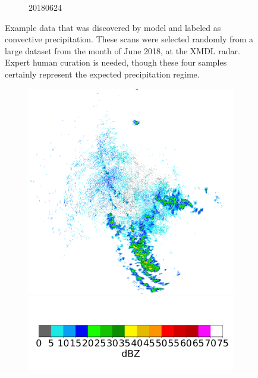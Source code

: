 \begin{figure}[h]
\begin{subfigure}[b]{0.45\textwidth}
		\caption{20180624}
		\label{fig:classifying_datadiscovery_ex4}
	\end{subfigure}
	\caption{Example data that was discovered by model and labeled as convective precipitation. These scans were selected randomly from a large dataset from the month of June 2018, at the XMDL radar. Expert human curation is needed, though these four samples certainly represent the expected precipitation regime.}
	\label{fig:classifying_datadiscovery}
\end{figure}

\begin{figure}[h]
	\centering
	\begin{subfigure}[b]{0.45\textwidth}
		\includegraphics[width=\textwidth]{./thesis_code/plots/midlothian-tx-20180903-063419-ref.png}
		\includegraphics[width=\textwidth]{./thesis_code/plots/dfw_colormap.png}

\end{subfigure}
\end{figure}
